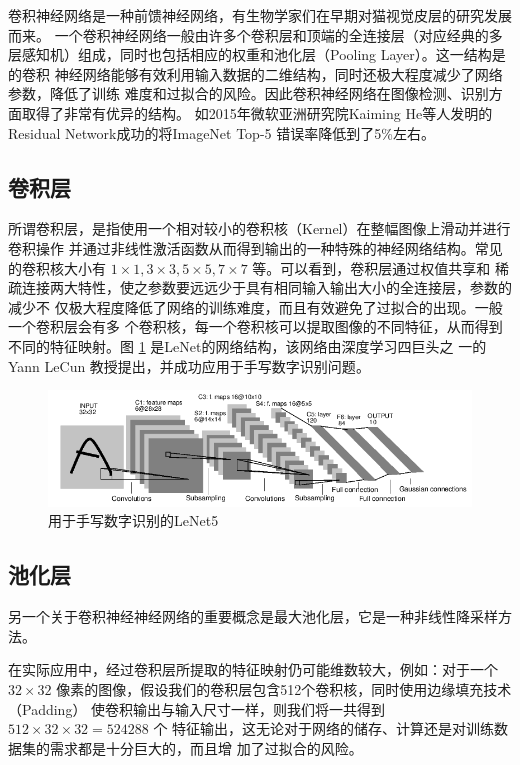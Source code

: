 卷积神经网络是一种前馈神经网络，有生物学家们在早期对猫视觉皮层的研究发展而来。
一个卷积神经网络一般由许多个卷积层和顶端的全连接层（对应经典的多
层感知机）组成，同时也包括相应的权重和池化层（Pooling Layer）。这一结构是的卷积
神经网络能够有效利用输入数据的二维结构，同时还极大程度减少了网络参数，降低了训练
难度和过拟合的风险。因此卷积神经网络在图像检测、识别方面取得了非常有优异的结构。
如2015年微软亚洲研究院Kaiming He等人发明的Residual Network成功的将ImageNet Top-5
错误率降低到了5\%左右\cite{He:2015tt}\cite{He:2016tq}。

\subsection{卷积层}

所谓卷积层，是指使用一个相对较小的卷积核（Kernel）在整幅图像上滑动并进行卷积操作
并通过非线性激活函数从而得到输出的一种特殊的神经网络结构。常见的卷积核大小有 $1
\times 1, 3 \times 3, 5 \times 5, 7 \times 7$ 等。可以看到，卷积层通过权值共享和
稀疏连接两大特性，使之参数要远远少于具有相同输入输出大小的全连接层，参数的减少不
仅极大程度降低了网络的训练难度，而且有效避免了过拟合的出现。一般一个卷积层会有多
个卷积核，每一个卷积核可以提取图像的不同特征，从而得到不同的特征映射。图
\ref{Fig:LeNet} 是LeNet\cite{LeCun:1990vp}的网络结构，该网络由深度学习四巨头之
一的Yann LeCun 教授提出，并成功应用于手写数字识别问题\cite{LeCun:1990vp}。

\begin{figure}[ht]
  \centering
  \includegraphics[width=1.0\linewidth]{./Figure/LeNet.png}
  \caption{用于手写数字识别的LeNet5\cite{LeCun:1990vp}} \label{Fig:LeNet}
\end{figure}

\subsection{池化层}

另一个关于卷积神经神经网络的重要概念是最大池化层，它是一种非线性降采样方法。

在实际应用中，经过卷积层所提取的特征映射仍可能维数较大，例如：对于一个 $32 \times
32$ 像素的图像，假设我们的卷积层包含512个卷积核，同时使用边缘填充技术（Padding）
使卷积输出与输入尺寸一样，则我们将一共得到 $512 \times 32 \times 32 = 524288$ 个
特征输出，这无论对于网络的储存、计算还是对训练数据集的需求都是十分巨大的，而且增
加了过拟合的风险。

